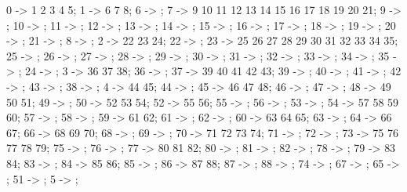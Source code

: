  {
        0 -> {1 2 3 4 5};
        1 -> {6 7 8};
        6 -> {};
        7 -> {9 10 11 12 13 14 15 16 17 18 19 20 21};
        9 -> {};
        10 -> {};
        11 -> {};
        12 -> {};
        13 -> {};
        14 -> {};
        15 -> {};
        16 -> {};
        17 -> {};
        18 -> {};
        19 -> {};
        20 -> {};
        21 -> {};
        8 -> {};
        2 -> {22 23 24};
        22 -> {};
        23 -> {25 26 27 28 29 30 31 32 33 34 35};
        25 -> {};
        26 -> {};
        27 -> {};
        28 -> {};
        29 -> {};
        30 -> {};
        31 -> {};
        32 -> {};
        33 -> {};
        34 -> {};
        35 -> {};
        24 -> {};
        3 -> {36 37 38};
        36 -> {};
        37 -> {39 40 41 42 43};
        39 -> {};
        40 -> {};
        41 -> {};
        42 -> {};
        43 -> {};
        38 -> {};
        4 -> {44 45};
        44 -> {};
        45 -> {46 47 48};
        46 -> {};
        47 -> {};
        48 -> {49 50 51};
        49 -> {};
        50 -> {52 53 54};
        52 -> {55 56};
        55 -> {};
        56 -> {};
        53 -> {};
        54 -> {57 58 59 60};
        57 -> {};
        58 -> {};
        59 -> {61 62};
        61 -> {};
        62 -> {};
        60 -> {63 64 65};
        63 -> {};
        64 -> {66 67};
        66 -> {68 69 70};
        68 -> {};
        69 -> {};
        70 -> {71 72 73 74};
        71 -> {};
        72 -> {};
        73 -> {75 76 77 78 79};
        75 -> {};
        76 -> {};
        77 -> {80 81 82};
        80 -> {};
        81 -> {};
        82 -> {};
        78 -> {};
        79 -> {83 84};
        83 -> {};
        84 -> {85 86};
        85 -> {};
        86 -> {87 88};
        87 -> {};
        88 -> {};
        74 -> {};
        67 -> {};
        65 -> {};
        51 -> {};
        5 -> {};
}